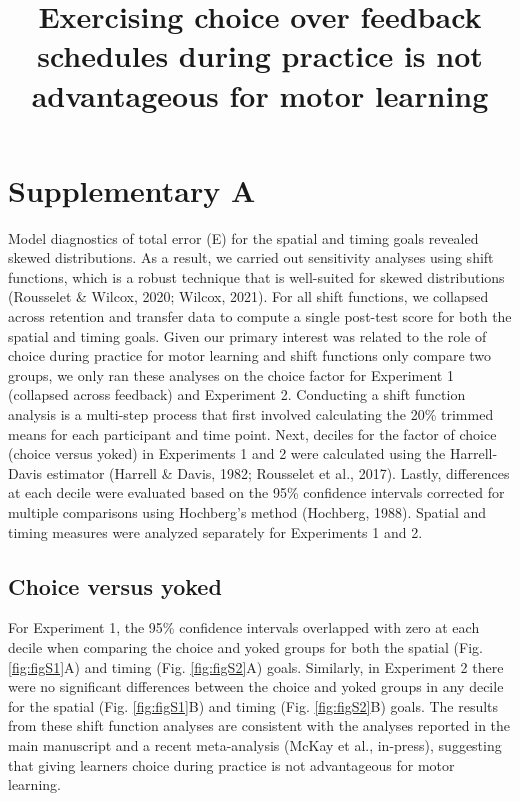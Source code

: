 \documentclass[
  doc, donotrepeattitle,floatsintext]{apa7}
\title{Exercising choice over feedback schedules during practice is not advantageous for motor learning}
\author{\phantom{0}}
\date{}
\affiliation{\phantom{0}}
\begin{document}
\maketitle

\hypertarget{supplementary-a}{%
\section{Supplementary A}\label{supplementary-a}}

Model diagnostics of total error (E) for the spatial and timing goals revealed skewed distributions. As a result, we carried out sensitivity analyses using shift functions, which is a robust technique that is well-suited for skewed distributions (Rousselet \& Wilcox, 2020; Wilcox, 2021). For all shift functions, we collapsed across retention and transfer data to compute a single post-test score for both the spatial and timing goals. Given our primary interest was related to the role of choice during practice for motor learning and shift functions only compare two groups, we only ran these analyses on the choice factor for Experiment 1 (collapsed across feedback) and Experiment 2. Conducting a shift function analysis is a multi-step process that first involved calculating the 20\% trimmed means for each participant and time point. Next, deciles for the factor of choice (choice versus yoked) in Experiments 1 and 2 were calculated using the Harrell-Davis estimator (Harrell \& Davis, 1982; Rousselet et al., 2017). Lastly, differences at each decile were evaluated based on the 95\% confidence intervals corrected for multiple comparisons using Hochberg's method (Hochberg, 1988). Spatial and timing measures were analyzed separately for Experiments 1 and 2.

\hypertarget{choice-versus-yoked}{%
\subsection{Choice versus yoked}\label{choice-versus-yoked}}

For Experiment 1, the 95\% confidence intervals overlapped with zero at each decile when comparing the choice and yoked groups for both the spatial (Fig. \ref{fig:figS1}A) and timing (Fig. \ref{fig:figS2}A) goals. Similarly, in Experiment 2 there were no significant differences between the choice and yoked groups in any decile for the spatial (Fig. \ref{fig:figS1}B) and timing (Fig. \ref{fig:figS2}B) goals. The results from these shift function analyses are consistent with the analyses reported in the main manuscript and a recent meta-analysis (McKay et al., in-press), suggesting that giving learners choice during practice is not advantageous for motor learning.
\end{document}
